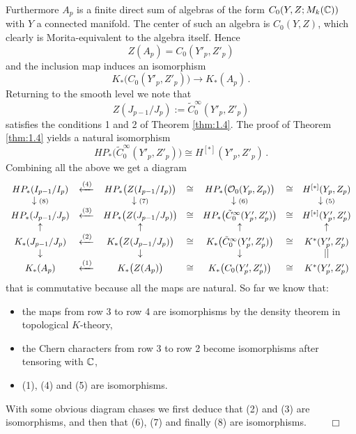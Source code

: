 Furthermore $A_p$ is a finite direct sum of algebras of the form
$C_0 (Y,Z;M_k (\mathbb C) )$ with $Y$ a connected manifold.
The center of such an algebra is $C_0 (Y,Z)$, which clearly
is Morita-equivalent to the algebra itself. Hence
\[
Z (A_p ) = C_0 (Y'_p , Z'_p )
\]
and the inclusion map induces an isomorphism
\[
K_* \big( C_0 (Y'_p , Z'_p ) \big) \to K_* (A_p ) \,.
\]
Returning to the smooth level we note that
\[
Z (J_{p-1}/J_p ) := \tilde C_0^\infty (Y'_p ,Z'_p )
\]
satisfies the conditions 1 and 2 of Theorem \ref{thm:1.4}.
The proof of Theorem \ref{thm:1.4} yields a natural isomorphism
\begin{equation}\label{eq:1.21}
HP_* \big( \tilde C_0^\infty (Y'_p ,Z'_p ) \big) \cong
H^{[*]} (Y'_p , Z'_p ) \,.
\end{equation}
Combining all the above we get a diagram
\[
\begin{array}{ccccccc}
HP_* (I_{p-1}/I_p ) & \xleftarrow{(4)} & HP_* \big( Z (I_{p-1}/I_p )
\big) & \cong & HP_* \big( \mathcal O_0 (Y_p ,Z_p ) \big) & \cong &
H^{[*]} (Y_p , Z_p ) \\
\downarrow {\scriptstyle(8)} & & \downarrow {\scriptstyle(7)} & &
\downarrow {\scriptstyle(6)} & & \downarrow {\scriptstyle(5)} \\
HP_* (J_{p-1}/J_p ) & \xleftarrow{(3)} & HP_* \big( Z (J_{p-1}/J_p ) \big) &
\cong & HP_* \big( \tilde C_0^\infty (Y'_p , Z'_p ) \big) & \cong &
H^{[*]} (Y'_p ,Z'_p ) \\
\uparrow & & \uparrow & & \uparrow & & \uparrow \\
K_* (J_{p-1}/J_p ) & \xleftarrow{(2)} & K_* \big( Z (J_{p-1}/J_p ) \big) &
\cong & K_* \big( \tilde C_0^\infty (Y'_p , Z'_p ) \big) & \cong &
K^* (Y'_p ,Z'_p ) \\
\downarrow & & \downarrow & & \downarrow & & || \\
K_* (A_p ) & \xleftarrow{(1)} & K_* \big( Z (A_p ) \big) &
\cong & K_* \big( C_0 (Y'_p , Z'_p ) \big) & \cong & K^* (Y'_p ,Z'_p )
\end{array}
\]
that is commutative because all the maps are natural. So far we know that:
\begin{itemize}
\item the maps from row 3 to row 4 are isomorphisms by the density
theorem in topological $K$-theory,
\item the Chern characters from row 3 to row 2 become isomorphisms
after tensoring with $\mathbb C$,
\item (1), (4) and (5) are isomorphisms.
\end{itemize}
With some obvious diagram chases we first deduce that (2) and (3)
are isomorphisms, and then that (6), (7)
and finally (8) are isomorphisms. $\qquad \Box$
\\[2mm]

